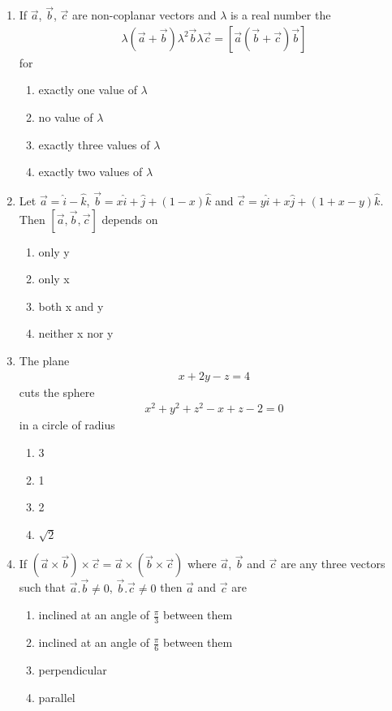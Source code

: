\begin{enumerate}[label=\arabic*.,ref=\thesubsection.\theenumi]
\item If $\overrightarrow{a}$, $\overrightarrow{b}$, $\overrightarrow{c}$ are non-coplanar vectors and $\lambda$ is a real number the 
\begin{align*}
\lambda(\overrightarrow{a} + \overrightarrow{b})\lambda^{2}\overrightarrow{b}\lambda\overrightarrow{c} = [\overrightarrow{a}  (\overrightarrow{b} + \overrightarrow{c}) \overrightarrow{b}]
\end{align*}
for
\begin{enumerate}
\item exactly one value of $\lambda$
\item no value of $\lambda$
\item exactly three values of $\lambda$
\item exactly two values of $\lambda$
\end{enumerate}

\item Let $\overrightarrow{a} = \hat{i} - \hat{k}$, $\overrightarrow{b} = x\hat{i} + \hat{j} + (1-x)\hat{k}$ and 
$\overrightarrow{c} = y\hat{i} + x\hat{j} + (1 + x - y)\hat{k}$. Then $[\overrightarrow{a}, \overrightarrow{b},\overrightarrow{c}]$ depends on
\begin{enumerate}
\item only y
\item only x
\item both x and y
\item neither x nor y
\end{enumerate}

\item The plane 
\begin{align*}
x + 2y - z = 4
\end{align*}
cuts the sphere
\begin{align}
x^2 + y^2 + z^2- x + z -2 = 0
\end{align}
in a circle of radius
\begin{enumerate}
\item 3
\item 1
\item 2
\item $\sqrt{2}$
\end{enumerate}

\item If $(\overrightarrow{a} \times \overrightarrow{b}) \times \overrightarrow{c}=\overrightarrow{a} \times (\overrightarrow{b} \times \overrightarrow{c})$ where $\overrightarrow{a}$, $\overrightarrow{b}$ and $\overrightarrow{c}$ are any three vectors such that $\overrightarrow{a}.\overrightarrow{b} \neq 0$, $\overrightarrow{b}.\overrightarrow{c} \neq 0$ then $\overrightarrow{a}$ and $\overrightarrow{c}$ are
\begin{enumerate}
\item inclined at an angle of $\frac{\pi}{3}$ between them
\item inclined at an angle of $\frac{\pi}{6}$ between them
\item perpendicular
\item parallel
\end{enumerate}


\end{enumerate}
